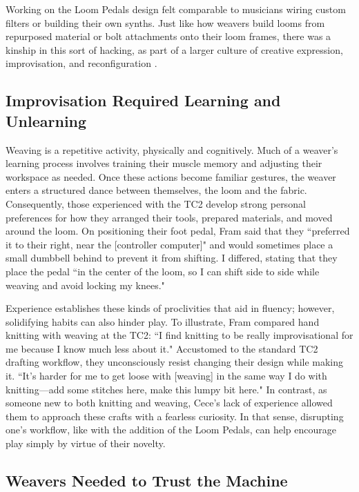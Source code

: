Working on the Loom Pedals design felt comparable to musicians wiring custom filters or building their own synths. Just like how weavers build looms from repurposed material or bolt attachments onto their loom frames, there was a kinship in this sort of hacking, as part of a larger culture of creative expression, improvisation, and reconfiguration \cite{facebookgroup_weaving_nodate, scoates_brian_2013}.

\subsection{Improvisation Required Learning and Unlearning}

Weaving is a repetitive activity, physically and cognitively. Much of a weaver’s learning process involves training their muscle memory and adjusting their workspace as needed. Once these actions become familiar gestures, the weaver enters a structured dance between themselves, the loom and the fabric. Consequently, those experienced with the TC2 develop strong personal preferences for how they arranged their tools, prepared materials, and moved around the loom. On positioning their foot pedal, Fram said that they ``preferred it to their right, near the [controller computer]" and would sometimes place a small dumbbell behind to prevent it from shifting. I differed, stating that they place the pedal ``in the center of the loom, so I can shift side to side while weaving and avoid locking my knees." 

Experience establishes these kinds of proclivities that aid in fluency; however, solidifying habits can also hinder play. To illustrate, Fram compared hand knitting with weaving at the TC2: “I find knitting to be really improvisational for me because I know much less about it." Accustomed to the standard TC2 drafting workflow, they unconsciously resist changing their design while making it. “It’s harder for me to get loose with [weaving] in the same way I do with knitting—add some stitches here, make this lumpy bit here." In contrast, as someone new to both knitting and weaving, Cece’s lack of experience allowed them to approach these crafts with a fearless curiosity. In that sense, disrupting one's workflow, like with the addition of the Loom Pedals, can help encourage play simply by virtue of their novelty.

\subsection{Weavers Needed to Trust the Machine}

